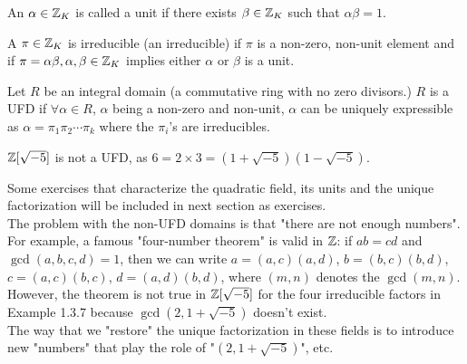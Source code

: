 \documentclass[12pt,twoside=semi,openright,numbers=noenddot]{scrbook}
\begin{document}
\begin{definition}[Unit]
    An $\alpha \in \mathbb Z_K$ is called a unit if there exists $\beta \in \mathbb Z_K$ such that 
    $\alpha \beta = 1$.    
\end{definition}
\begin{definition}[Irreducible]
    A $\pi \in \mathbb Z_K$ is irreducible (an irreducible) if $\pi$ is a non-zero, non-unit element and if 
    $\pi = \alpha\beta, \alpha, \beta \in \mathbb Z_K$ implies either $\alpha$ or $\beta$ is a unit.
\end{definition}
\begin{definition}
    Let $R$ be an integral domain (a commutative ring with no zero divisors.) $R$ is a UFD if 
    $\forall \alpha \in R$, $\alpha$ being a non-zero and non-unit, $\alpha$ can be uniquely expressible 
    as $\alpha = \pi_1\pi_2\cdots\pi_k$ where the $\pi_i$'s are irreducibles.
\end{definition}
    \begin{example}
        $\mathbb Z[\sqrt{-5}]$ is not a UFD, as $6 = 2\times 3 = (1+\sqrt{-5})(1-\sqrt{-5})$.
    \end{example}

Some exercises that characterize the quadratic field, its units and the unique factorization will be included in next section 
as exercises. \\
\newline
The problem with the non-UFD domains is that "there are not enough numbers". For example, a famous "four-number theorem"
is valid in $\mathbb Z$: if $ab = cd$ and $\gcd(a,b,c,d) = 1$, then we can write 
$a = (a,c)(a,d)$, $b=(b,c)(b,d)$, $c=(a,c)(b,c)$, $d=(a,d)(b,d)$, where $(m,n)$ denotes the 
$\gcd(m,n)$. However, the theorem is not true in 
$\mathbb Z[\sqrt{-5}]$ for the four irreducible factors in Example 1.3.7 because $\gcd(2, 1+\sqrt{-5})$ doesn't exist. \\
The way that we "restore" the unique factorization in these fields is to introduce new "numbers" that play the role of 
"$(2, 1+\sqrt{-5})$", etc. 
\end{document}
